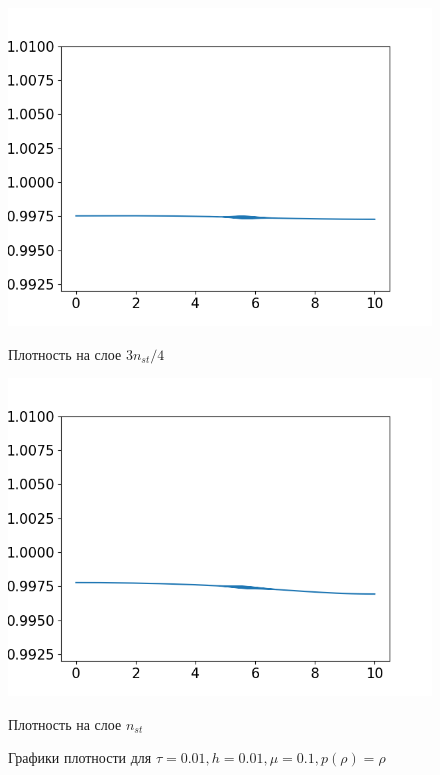 \begin{figure}[h]
\begin{minipage}[h]{0.47\linewidth}
		\includegraphics[width=1\linewidth]{pics/task2/34h_2.png} 
		\caption{Плотность на слое $3n_{st} / 4$}
	\end{minipage}
	\hfill
	\begin{minipage}[h]{0.47\linewidth}
		\centering
		\includegraphics[width=1\linewidth]{pics/task2/44h_2.png} 
		\caption{Плотность на слое $n_{st}$}
	\end{minipage}
	\caption{Графики плотности для $\tau = 0.01, h = 0.01, \mu = 0.1, p(\rho) = \rho$}
\end{figure}

